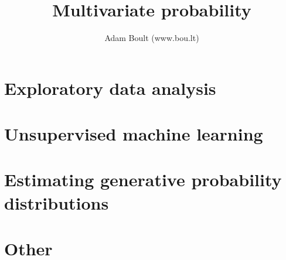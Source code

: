 \documentclass[oneside]{book}
\begin{document}
\author{Adam Boult (www.bou.lt)}
\title{Multivariate probability}
\maketitle

\setcounter{tocdepth}{0}
\tableofcontents



\part{Exploratory data analysis}




\part{Unsupervised machine learning}



\part{Estimating generative probability distributions}



\part{Other}

\end{document}
